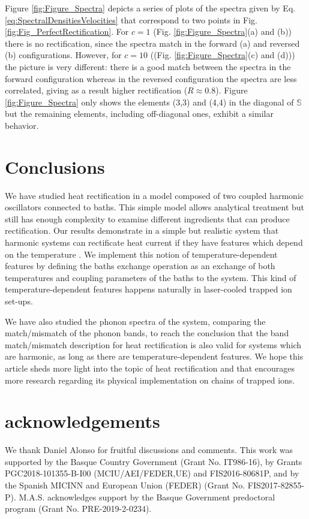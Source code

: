 %
Figure \ref{fig:Figure_Spectra} depicts a series of plots of the spectra given by Eq. \eqref{eq:SpectralDensitiesVelocities} that correspond to two points in Fig. \ref{fig:Fig_PerfectRectification}. For $c=1$ (Fig. \ref{fig:Figure_Spectra}(a) and (b)) there is no rectification, since the spectra match in the forward (a) and reversed (b) configurations. However, for $c=10$ ((Fig. \ref{fig:Figure_Spectra}(c) and (d))) the picture is very different: there is a good match between the spectra in the forward configuration whereas in the reversed configuration the spectra are less correlated, giving as a result higher rectification ($R \approx 0.8$). Figure \ref{fig:Figure_Spectra} only shows the elements (3,3) and (4,4) in the diagonal of $\mathbb{S}$ but the remaining elements, including off-diagonal ones, exhibit a similar behavior.
%
\section{Conclusions \label{sec:Conclusions}}
%
We have studied heat rectification in a model composed of two coupled harmonic oscillators connected to baths. This simple model allows analytical treatment but still has enough complexity to examine different ingredients that can produce rectification. %
Our results demonstrate in a simple but realistic system that harmonic systems can rectificate heat current if they have features which depend on the temperature  \cite{Pereira2017}. We implement this notion of temperature-dependent features by defining the baths exchange operation as an exchange of both temperatures and coupling parameters of the baths to the system. This kind of temperature-dependent features happens naturally in laser-cooled trapped ion set-ups.

We have also studied the phonon spectra of the system, comparing the match/mismatch of the phonon bands, to reach the conclusion that the band match/mismatch description for heat rectification is also valid for systems which are harmonic, as long as there are temperature-dependent features.
We hope this article sheds more light into the topic of heat rectification and that encourages more research regarding its physical implementation on chains of trapped ions.

\section{acknowledgements}
We thank Daniel Alonso for fruitful discussions and comments. This work was supported by the Basque Country Government (Grant No. IT986-16), by Grants PGC2018-101355-B-I00 (MCIU/AEI/FEDER,UE) and FIS2016-80681P, and by the Spanish MICINN and European Union (FEDER) (Grant No. FIS2017-82855-P). M.A.S. acknowledges support by the Basque Government predoctoral program (Grant No. PRE-2019-2-0234).

